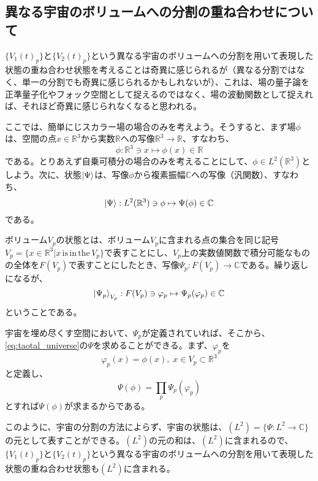 \subsection{異なる宇宙のボリュームへの分割の重ね合わせについて}
$\{V_1(t)_p\}$と$\{V_2(t)_p\}$という異なる宇宙のボリュームへの分割を用いて表現した状態の重ね合わせ状態を考えることは奇異に感じられるが（異なる分割ではなく、単一の分割でも奇異に感じられるかもしれないが）、これは、場の量子論を正準量子化やフォック空間として捉えるのではなく、場の波動関数として捉えれば、それほど奇異に感じられなくなると思われる。\par
ここでは、簡単にじスカラー場の場合のみを考えよう。そうすると、まず場$\phi$は、空間の点$x \in \mathbb{R}^3$から実数$\mathbb{R}$への写像$\mathbb{R}^3 \to \mathbb{R}$、すなわち、
\begin{equation}
    \phi : \mathbb{R}^3 \ni x \mapsto \phi (x) \in \mathbb{R}
\end{equation}
である。とりあえず自乗可積分の場合のみを考えることにして、$\phi \in L^2(\mathbb{R}^3)$としよう。次に、状態$\ket{\Psi}$は、写像$\phi$から複素振幅$\mathbb{C}$への写像（汎関数）、すなわち、
\begin{equation}
    \label{eq:taotal_universe}
    \ket{\Psi} :  L^2(\mathbb{R}^3) \ni \phi \mapsto \Psi (\phi) \in \mathbb{C}
\end{equation}
である。\par
ボリューム$V_p$の状態とは、ボリューム$V_p$に含まれる点の集合を同じ記号$V_p=\{x \in \mathbb{R}^3 | x \mathrm{\, is\, in\, the\, }V_p\}$で表すことにし、$V_p$上の実数値関数で積分可能なものの全体を$F(V_p)$で表すことにしたとき、写像$\Psi_p : F(V_p) \to \mathbb{C}$である。繰り返しになるが、
\begin{equation}
    \ket{\Psi_p}_{V_p} :  F(V_p) \ni \varphi_p \mapsto \Psi_p (\varphi_p) \in \mathbb{C}
\end{equation}
ということである。\par
宇宙を埋め尽くす空間において、$\Psi_p$が定義されていれば、そこから、\eqref{eq:taotal_universe}の$\Psi$を求めることができる。まず、$\varphi_p$を
\begin{equation}
     \varphi_p(x) = \phi(x),\; x \in V_p \subset \mathbb{R}^3
\end{equation}
と定義し、
\begin{equation}
    \Psi (\phi) = \prod_p \Psi_p(\varphi_p)
\end{equation}
とすれば$\Psi (\phi)$が求まるからである。\par
このように、宇宙の分割の方法によらず、宇宙の状態は、$(L^2) = \{\Psi : L^2 \to \mathbb{C}\}$の元として表すことができる。$(L^2)$の元の和は、$(L^2)$に含まれるので、$\{V_1(t)_p\}$と$\{V_2(t)_p\}$という異なる宇宙のボリュームへの分割を用いて表現した状態の重ね合わせ状態も$(L^2)$に含まれる。